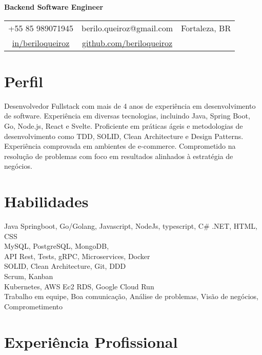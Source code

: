 \documentclass[11pt,a4paper,sans]{moderncv}
\begin{document}
\makecvtitle
\vspace*{-16mm}
\begin{center}\textbf{ Backend Software Engineer}\end{center}
\begin{center}
	\begin{tabular}{ c c c }
		\faMobile\enspace +55 85 989071945                                                                  & \enspace berilo.queiroz@gmail.com & \enspace\faHome\enspace Fortaleza, BR \\
		\faLinkedin\enspace \color{blue} \href{https://www.linkedin.com/in/beriloqueiroz}{in/beriloqueiroz} &
		\faGithub\enspace \color{blue} \href{https://github.com/beriloqueiroz}{github.com/beriloqueiroz}    & \enspace
	\end{tabular}
\end{center}

\section{Perfil}
 {
  Desenvolvedor Fullstack com mais de 4 anos de experiência em desenvolvimento de software. Experiência em diversas tecnologias, incluindo Java, Spring Boot, Go, Node.js, React e Svelte. Proficiente em práticas ágeis e metodologias de desenvolvimento como TDD, SOLID, Clean Architecture e Design Patterns. Experiência comprovada em ambientes de e-commerce. Comprometido na resolução de problemas com foco em resultados alinhados à estratégia de negócios.
 }

\section{Habilidades}
 {
  Java Springboot, Go/Golang, Javascript, NodeJs, typescript, C\# .NET, HTML, CSS \\
  MySQL, PostgreSQL, MongoDB, \\
  API Rest, Tests, gRPC, Microservices, Docker\\
  SOLID, Clean Architecture, Git, DDD \\
  Scrum, Kanban\\
  Kubernetes, AWS Ec2 RDS, Google Cloud Run\\
  Trabalho em equipe, Boa comunicação, Análise de problemas, Visão de negócios, Comprometimento\\
 }

\section{Experiência Profissional}
\end{document}

